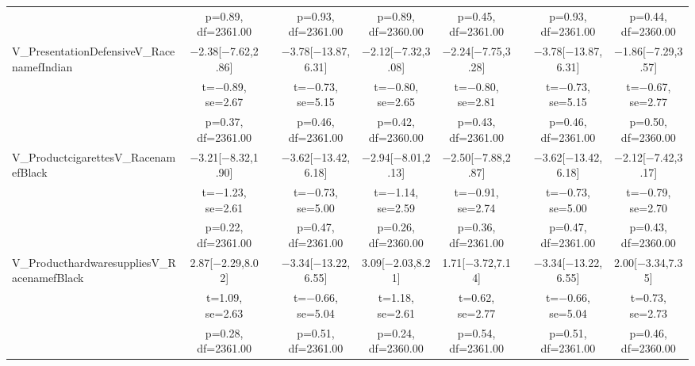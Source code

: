 \documentclass[]{report}
\begin{document}
\begin{table}
{\begin{tabular}[t]{lcccccccc}
		& p=\num{0.89}, df=\num{2361.00} &  & p=\num{0.93}, df=\num{2361.00} & p=\num{0.89}, df=\num{2360.00} & p=\num{0.45}, df=\num{2361.00} &  & p=\num{0.93}, df=\num{2361.00} & p=\num{0.44}, df=\num{2360.00}\\
		V\_PresentationDefensiveV\_RacenamefIndian & \num{-2.38}[\num{-7.62},\num{2.86}] &  & \num{-3.78}[\num{-13.87},\num{6.31}] & \num{-2.12}[\num{-7.32},\num{3.08}] & \num{-2.24}[\num{-7.75},\num{3.28}] &  & \num{-3.78}[\num{-13.87},\num{6.31}] & \num{-1.86}[\num{-7.29},\num{3.57}]\\
		& t=\num{-0.89}, se=\num{2.67} &  & t=\num{-0.73}, se=\num{5.15} & t=\num{-0.80}, se=\num{2.65} & t=\num{-0.80}, se=\num{2.81} &  & t=\num{-0.73}, se=\num{5.15} & t=\num{-0.67}, se=\num{2.77}\\
		& p=\num{0.37}, df=\num{2361.00} &  & p=\num{0.46}, df=\num{2361.00} & p=\num{0.42}, df=\num{2360.00} & p=\num{0.43}, df=\num{2361.00} &  & p=\num{0.46}, df=\num{2361.00} & p=\num{0.50}, df=\num{2360.00}\\
		V\_ProductcigarettesV\_RacenamefBlack & \num{-3.21}[\num{-8.32},\num{1.90}] &  & \num{-3.62}[\num{-13.42},\num{6.18}] & \num{-2.94}[\num{-8.01},\num{2.13}] & \num{-2.50}[\num{-7.88},\num{2.87}] &  & \num{-3.62}[\num{-13.42},\num{6.18}] & \num{-2.12}[\num{-7.42},\num{3.17}]\\
		& t=\num{-1.23}, se=\num{2.61} &  & t=\num{-0.73}, se=\num{5.00} & t=\num{-1.14}, se=\num{2.59} & t=\num{-0.91}, se=\num{2.74} &  & t=\num{-0.73}, se=\num{5.00} & t=\num{-0.79}, se=\num{2.70}\\
		& p=\num{0.22}, df=\num{2361.00} &  & p=\num{0.47}, df=\num{2361.00} & p=\num{0.26}, df=\num{2360.00} & p=\num{0.36}, df=\num{2361.00} &  & p=\num{0.47}, df=\num{2361.00} & p=\num{0.43}, df=\num{2360.00}\\
		V\_ProducthardwaresuppliesV\_RacenamefBlack & \num{2.87}[\num{-2.29},\num{8.02}] &  & \num{-3.34}[\num{-13.22},\num{6.55}] & \num{3.09}[\num{-2.03},\num{8.21}] & \num{1.71}[\num{-3.72},\num{7.14}] &  & \num{-3.34}[\num{-13.22},\num{6.55}] & \num{2.00}[\num{-3.34},\num{7.35}]\\
		& t=\num{1.09}, se=\num{2.63} &  & t=\num{-0.66}, se=\num{5.04} & t=\num{1.18}, se=\num{2.61} & t=\num{0.62}, se=\num{2.77} &  & t=\num{-0.66}, se=\num{5.04} & t=\num{0.73}, se=\num{2.73}\\
		& p=\num{0.28}, df=\num{2361.00} &  & p=\num{0.51}, df=\num{2361.00} & p=\num{0.24}, df=\num{2360.00} & p=\num{0.54}, df=\num{2361.00} &  & p=\num{0.51}, df=\num{2361.00} & p=\num{0.46}, df=\num{2360.00}\\

\end{tabular}}
\end{table}
\end{document}
